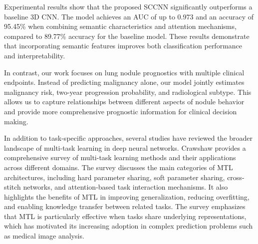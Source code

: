 Experimental results show that the proposed SCCNN significantly outperforms a baseline 3D CNN. The model achieves an AUC of up to 0.973 and an accuracy of 95.45\% when combining semantic characteristics and attention mechanisms, compared to 89.77\% accuracy for the baseline model. These results demonstrate that incorporating semantic features improves both classification performance and interpretability.

In contrast, our work focuses on lung nodule prognostics with multiple clinical endpoints. Instead of predicting malignancy alone, our model jointly estimates malignancy risk, two-year progression probability, and radiological subtype. This allows us to capture relationships between different aspects of nodule behavior and provide more comprehensive prognostic information for clinical decision making.

\vspace{0.5cm}

In addition to task-specific approaches, several studies have reviewed the broader landscape of multi-task learning in deep neural networks. Crawshaw\cite{crawshaw2020multitasklearningdeepneural} provides a comprehensive survey of multi-task learning methods and their applications across different domains. The survey discusses the main categories of MTL architectures, including hard parameter sharing, soft parameter sharing, cross-stitch networks, and attention-based task interaction mechanisms. It also highlights the benefits of MTL in improving generalization, reducing overfitting, and enabling knowledge transfer between related tasks. The survey emphasizes that MTL is particularly effective when tasks share underlying representations, which has motivated its increasing adoption in complex prediction problems such as medical image analysis.

